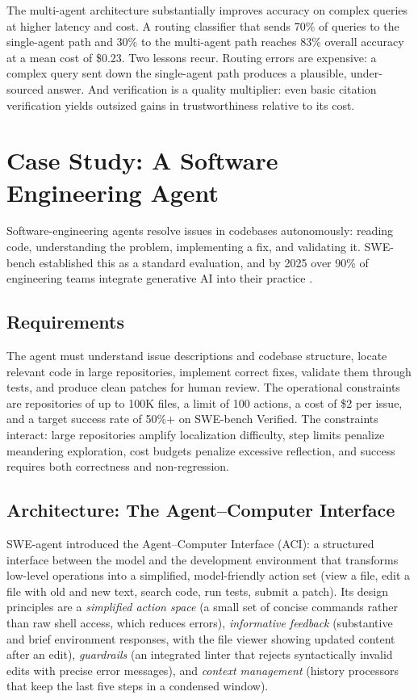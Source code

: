 \documentclass[11pt]{book}
\begin{document}
The multi-agent architecture substantially improves accuracy on complex queries at higher latency and cost. A routing classifier that sends 70\% of queries to the single-agent path and 30\% to the multi-agent path reaches 83\% overall accuracy at a mean cost of \$0.23. Two lessons recur. Routing errors are expensive: a complex query sent down the single-agent path produces a plausible, under-sourced answer. And verification is a quality multiplier: even basic citation verification yields outsized gains in trustworthiness relative to its cost.

\section{Case Study: A Software Engineering Agent}

Software-engineering agents resolve issues in codebases autonomously: reading code, understanding the problem, implementing a fix, and validating it. SWE-bench \cite{swebench2024} established this as a standard evaluation, and by 2025 over 90\% of engineering teams integrate generative AI into their practice \cite{sweevo2025}.

\subsection{Requirements}

The agent must understand issue descriptions and codebase structure, locate relevant code in large repositories, implement correct fixes, validate them through tests, and produce clean patches for human review. The operational constraints are repositories of up to 100K files, a limit of 100 actions, a cost of \$2 per issue, and a target success rate of 50\%+ on SWE-bench Verified. The constraints interact: large repositories amplify localization difficulty, step limits penalize meandering exploration, cost budgets penalize excessive reflection, and success requires both correctness and non-regression.

\subsection{Architecture: The Agent--Computer Interface}

SWE-agent \cite{sweagent2024} introduced the Agent--Computer Interface (ACI): a structured interface between the model and the development environment that transforms low-level operations into a simplified, model-friendly action set (view a file, edit a file with old and new text, search code, run tests, submit a patch). Its design principles are a \textit{simplified action space} (a small set of concise commands rather than raw shell access, which reduces errors), \textit{informative feedback} (substantive and brief environment responses, with the file viewer showing updated content after an edit), \textit{guardrails} (an integrated linter that rejects syntactically invalid edits with precise error messages), and \textit{context management} (history processors that keep the last five steps in a condensed window).
\end{document}
